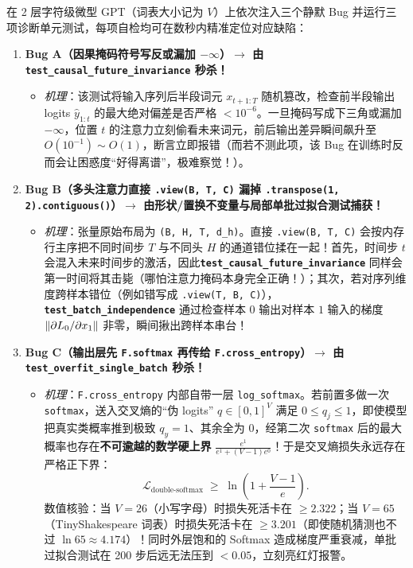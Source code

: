 在 2 层字符级微型 GPT（词表大小记为 $V$）上依次注入三个静默 Bug 并运行三项诊断单元测试，每项自检均可在数秒内精准定位对应缺陷：
\begin{enumerate}
  \item \textbf{Bug A（因果掩码符号写反或漏加 $-\infty$）$\longrightarrow$ 由 \texttt{test\_causal\_\allowbreak future\_invariance} 秒杀！}
  \begin{itemize}
    \item \emph{机理}：该测试将输入序列后半段词元 $x_{t+1:T}$ 随机篡改，检查前半段输出 logits $\hat{y}_{1:t}$ 的最大绝对偏差是否严格 $< 10^{-6}$。一旦掩码写成下三角或漏加 $-\infty$，位置 $t$ 的注意力立刻偷看未来词元，前后输出差异瞬间飙升至 $O(10^{-1}) \sim O(1)$，断言立即报错（而若不测此项，该 Bug 在训练时反而会让困惑度“好得离谱”，极难察觉！）。
  \end{itemize}
  \item \textbf{Bug B（多头注意力直接 \texttt{.view(B, T, C)} 漏掉 \texttt{.transpose(1, 2).\allowbreak contiguous()}）$\longrightarrow$ 由形状/置换不变量与局部单批过拟合测试捕获！}
  \begin{itemize}
    \item \emph{机理}：张量原始布局为 \texttt{(B, H, T, d\_h)}。直接 \texttt{.view(B, T, C)} 会按内存行主序把不同时间步 $T$ 与不同头 $H$ 的通道错位揉在一起！首先，时间步 $t$ 会混入未来时间步的激活，因此\textbf{\texttt{test\_causal\_\allowbreak future\_invariance}} 同样会第一时间将其击毙（哪怕注意力掩码本身完全正确！）；其次，若对序列维度跨样本错位（例如错写成 \texttt{.view(T, B, C)}），\textbf{\texttt{test\_batch\_\allowbreak independence}} 通过检查样本 $0$ 输出对样本 $1$ 输入的梯度 $\left\|\partial L_0 / \partial x_1\right\|$ 非零，瞬间揪出跨样本串台！
  \end{itemize}
  \item \textbf{Bug C（输出层先 \texttt{F.softmax} 再传给 \texttt{F.cross\_entropy}）$\longrightarrow$ 由 \texttt{test\_overfit\_\allowbreak single\_batch} 秒杀！}
  \begin{itemize}
    \item \emph{机理}：\texttt{F.cross\_entropy} 内部自带一层 \texttt{log\_softmax}。若前置多做一次 \texttt{softmax}，送入交叉熵的“伪 logits” $q \in [0,1]^V$ 满足 $0 \le q_j \le 1$，即使模型把真实类概率推到极致 $q_{y} = 1$、其余全为 $0$，经第二次 \texttt{softmax} 后的最大概率也存在\textbf{不可逾越的数学硬上界} $\frac{e^1}{e^1 + (V - 1)e^0}$！于是交叉熵损失永远存在严格正下界：
    \[
      \mathcal{L}_{\text{double-softmax}} \;\ge\; \ln\!\left(1 + \frac{V - 1}{e}\right).
    \]
    数值核验：当 $V = 26$（小写字母）时损失死活卡在 $\ge \mathbf{2.322}$；当 $V = 65$（TinyShakespeare 词表）时损失死活卡在 $\ge \mathbf{3.201}$（即使随机猜测也不过 $\ln 65 \approx 4.174$）！同时外层饱和的 Softmax 造成梯度严重衰减，单批过拟合测试在 200 步后远无法压到 $< 0.05$，立刻亮红灯报警。
  \end{itemize}
\end{enumerate}

